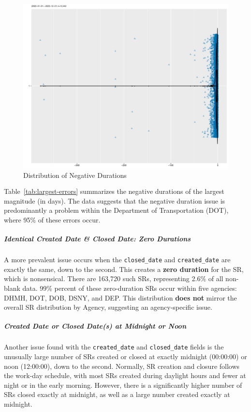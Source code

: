 \documentclass[linenumber]{jdsart}
\begin{document}
\begin{figure}[tbp]
	 \centering
 	 \includegraphics[width=\textwidth]{negative_duration_SR_violin.pdf}
 \caption{Distribution of Negative Durations}
 \label{fig:negative-duration-violin}
\end{figure}

Table~\ref{tab:largest-errors} summarizes the 
negative durations of the largest magnitude (in days). The data 
suggests that the negative duration issue is predominantly a problem 
within the Department of Transportation (DOT), where 95\% of these 
errors occur.


	
\subparagraph{Identical Created Date \& Closed Date: Zero Durations}
A more prevalent issue occurs when the \texttt{closed\_date} and 
\texttt{created\_date} are exactly the same, down to the second. This 
creates a \textbf{zero duration} for the SR, which is nonsensical. There 
are 163,720 such SRs, representing 2.6\% of all non-blank data. 
99\% percent of these zero-duration SRs occur within five agencies:
DHMH, DOT, DOB, DSNY, and DEP. This distribution \textbf{does not} 
mirror the overall SR distribution by Agency, suggesting 
an agency-specific issue.
	
		
\subparagraph{Created Date or Closed Date(s) at Midnight or Noon}
Another issue found with the \texttt{created\_date} and 
\texttt{closed\_date} fields is the unusually large number of SRs 
created or closed at exactly midnight (00:00:00) or noon (12:00:00), 
down to the second. Normally, SR creation and closure follows the 
work-day schedule, with most SRs created during daylight hours and 
fewer at night or in the early morning. However, there is a 
significantly higher number of SRs closed exactly at midnight, 
as well as a large number created exactly at midnight. 
\end{document}
